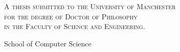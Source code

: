\begin{titlepage}
	
	
	\begin{center}
		
		\vspace*{1.0in}
		
		{\LARGE\textbf{\thesistitle}}
		
		\vfill
		
		\textsc{A thesis submitted to the University of Manchester\\for the degree of Doctor
		of Philosophy\\in the Faculty of Science and Engineering.}
		
		\vfill
		
		\thesisyear
		
		\vfill
		
		\thesisauthor
		
		\vfill
		
		School of Computer Science
		
		\vfill
		
		
	\end{center}
	
\end{titlepage}
